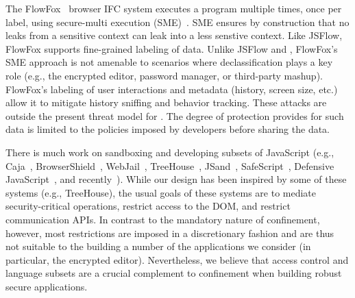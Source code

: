 The FlowFox~\cite{DeGroef:2012} browser IFC system executes a
program multiple times, once per label, using secure-multi execution
(SME)~\cite{Devriese:2010}. SME ensures by construction that no leaks
from a sensitive context can leak into a less senstive context.
%
Like JSFlow, FlowFox supports fine-grained labeling of data.
%
Unlike JSFlow and \sys{}, FlowFox's SME approach is not amenable to
scenarios where declassification plays a key role (e.g., the encrypted
editor, password manager, or third-party mashup).
%
FlowFox's labeling of user interactions and metadata (history, screen
size, etc.) allow it to mitigate history sniffing and behavior
tracking.
%
These attacks are outside the present threat model for \sys{}.  The
degree of protection \sys{} provides for such data is limited to the
policies imposed by developers before sharing the data.

%



There is much work on sandboxing and developing subsets of JavaScript (e.g.,
Caja~\cite{GoogleCaja}, BrowserShield~\cite{Reis:2007},
WebJail~\cite{VanAcker:2011}, TreeHouse~\cite{Ingram:2012},
JSand~\cite{Agten:2012:JCC}, SafeScript~\cite{SafeScript}, Defensive
JavaScript~\cite{djs}, and recently~\cite{Howell:2013}). 
%
While our design has been inspired by some of these systems (e.g.,
TreeHouse), the usual goals of these systems are to mediate
security-critical operations, restrict access to the DOM, and restrict
communication APIs\@.
%
In contrast to the mandatory nature of confinement, however, most restrictions
are imposed in a discretionary fashion and are thus not suitable to the
building a number of the applications we consider (in particular, the encrypted
editor).
%
Nevertheless, we believe that access control and language subsets are a crucial
complement to confinement when building robust secure applications.



